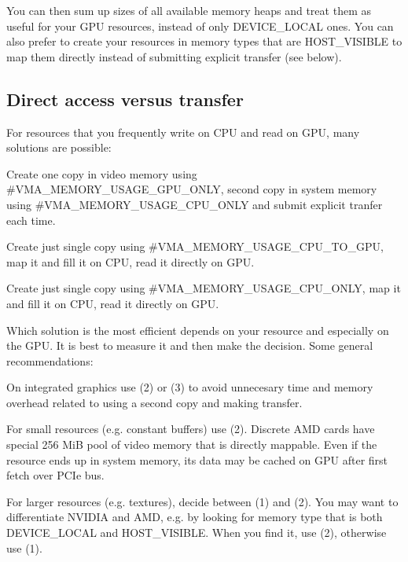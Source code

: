 You can then sum up sizes of all available memory heaps and treat them as useful for your G\+PU resources, instead of only {\ttfamily D\+E\+V\+I\+C\+E\+\_\+\+L\+O\+C\+AL} ones. You can also prefer to create your resources in memory types that are {\ttfamily H\+O\+S\+T\+\_\+\+V\+I\+S\+I\+B\+LE} to map them directly instead of submitting explicit transfer (see below).\hypertarget{usage_patterns_usage_patterns_direct_vs_transfer}{}\subsection{Direct access versus transfer}\label{usage_patterns_usage_patterns_direct_vs_transfer}
For resources that you frequently write on C\+PU and read on G\+PU, many solutions are possible\+:


\begin{DoxyEnumerate}
\item Create one copy in video memory using \#\+V\+M\+A\+\_\+\+M\+E\+M\+O\+R\+Y\+\_\+\+U\+S\+A\+G\+E\+\_\+\+G\+P\+U\+\_\+\+O\+N\+LY, second copy in system memory using \#\+V\+M\+A\+\_\+\+M\+E\+M\+O\+R\+Y\+\_\+\+U\+S\+A\+G\+E\+\_\+\+C\+P\+U\+\_\+\+O\+N\+LY and submit explicit tranfer each time.
\item Create just single copy using \#\+V\+M\+A\+\_\+\+M\+E\+M\+O\+R\+Y\+\_\+\+U\+S\+A\+G\+E\+\_\+\+C\+P\+U\+\_\+\+T\+O\+\_\+\+G\+PU, map it and fill it on C\+PU, read it directly on G\+PU.
\item Create just single copy using \#\+V\+M\+A\+\_\+\+M\+E\+M\+O\+R\+Y\+\_\+\+U\+S\+A\+G\+E\+\_\+\+C\+P\+U\+\_\+\+O\+N\+LY, map it and fill it on C\+PU, read it directly on G\+PU.
\end{DoxyEnumerate}

Which solution is the most efficient depends on your resource and especially on the G\+PU. It is best to measure it and then make the decision. Some general recommendations\+:


\begin{DoxyItemize}
\item On integrated graphics use (2) or (3) to avoid unnecesary time and memory overhead related to using a second copy and making transfer.
\item For small resources (e.\+g. constant buffers) use (2). Discrete A\+MD cards have special 256 MiB pool of video memory that is directly mappable. Even if the resource ends up in system memory, its data may be cached on G\+PU after first fetch over P\+C\+Ie bus.
\item For larger resources (e.\+g. textures), decide between (1) and (2). You may want to differentiate N\+V\+I\+D\+IA and A\+MD, e.\+g. by looking for memory type that is both {\ttfamily D\+E\+V\+I\+C\+E\+\_\+\+L\+O\+C\+AL} and {\ttfamily H\+O\+S\+T\+\_\+\+V\+I\+S\+I\+B\+LE}. When you find it, use (2), otherwise use (1).
\end{DoxyItemize}

